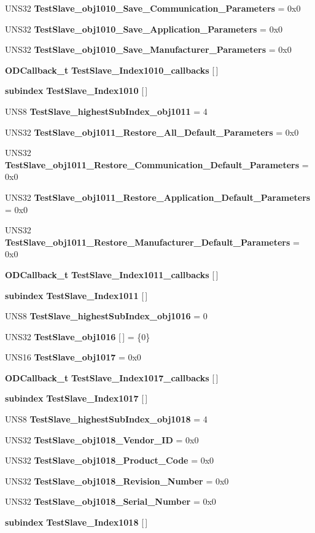 \begin{CompactItemize}
\item 
UNS32 {\bf Test\-Slave\_\-obj1010\_\-Save\_\-Communication\_\-Parameters} = 0x0
\item 
UNS32 {\bf Test\-Slave\_\-obj1010\_\-Save\_\-Application\_\-Parameters} = 0x0
\item 
UNS32 {\bf Test\-Slave\_\-obj1010\_\-Save\_\-Manufacturer\_\-Parameters} = 0x0
\item 
{\bf ODCallback\_\-t} {\bf Test\-Slave\_\-Index1010\_\-callbacks} [$\,$]
\item 
{\bf subindex} {\bf Test\-Slave\_\-Index1010} [$\,$]
\item 
UNS8 {\bf Test\-Slave\_\-highest\-Sub\-Index\_\-obj1011} = 4
\item 
UNS32 {\bf Test\-Slave\_\-obj1011\_\-Restore\_\-All\_\-Default\_\-Parameters} = 0x0
\item 
UNS32 {\bf Test\-Slave\_\-obj1011\_\-Restore\_\-Communication\_\-Default\_\-Parameters} = 0x0
\item 
UNS32 {\bf Test\-Slave\_\-obj1011\_\-Restore\_\-Application\_\-Default\_\-Parameters} = 0x0
\item 
UNS32 {\bf Test\-Slave\_\-obj1011\_\-Restore\_\-Manufacturer\_\-Default\_\-Parameters} = 0x0
\item 
{\bf ODCallback\_\-t} {\bf Test\-Slave\_\-Index1011\_\-callbacks} [$\,$]
\item 
{\bf subindex} {\bf Test\-Slave\_\-Index1011} [$\,$]
\item 
UNS8 {\bf Test\-Slave\_\-highest\-Sub\-Index\_\-obj1016} = 0
\item 
UNS32 {\bf Test\-Slave\_\-obj1016} [$\,$] = \{0\}
\item 
UNS16 {\bf Test\-Slave\_\-obj1017} = 0x0
\item 
{\bf ODCallback\_\-t} {\bf Test\-Slave\_\-Index1017\_\-callbacks} [$\,$]
\item 
{\bf subindex} {\bf Test\-Slave\_\-Index1017} [$\,$]
\item 
UNS8 {\bf Test\-Slave\_\-highest\-Sub\-Index\_\-obj1018} = 4
\item 
UNS32 {\bf Test\-Slave\_\-obj1018\_\-Vendor\_\-ID} = 0x0
\item 
UNS32 {\bf Test\-Slave\_\-obj1018\_\-Product\_\-Code} = 0x0
\item 
UNS32 {\bf Test\-Slave\_\-obj1018\_\-Revision\_\-Number} = 0x0
\item 
UNS32 {\bf Test\-Slave\_\-obj1018\_\-Serial\_\-Number} = 0x0
\item 
{\bf subindex} {\bf Test\-Slave\_\-Index1018} [$\,$]

\end{CompactItemize}
